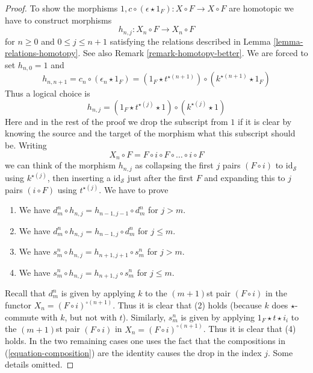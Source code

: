 \begin{proof}
\medskip\noindent
To show the morphisms
$1, c \circ (\epsilon \star 1_F) : X \circ F \to X \circ F$
are homotopic we have to construct morphisms
$$
h_{n, j} : X_n \circ F \longrightarrow X_n \circ F
$$
for $n \geq 0$ and $0 \leq j \leq n + 1$
satisfying the relations described in Lemma \ref{lemma-relations-homotopy}.
See also Remark \ref{remark-homotopy-better}.
We are forced to set $h_{n, 0} = 1$ and
$$
h_{n , n + 1} = c_n \circ (\epsilon_n \star 1_F) =
(1_F \star t^{\star (n + 1)}) \circ (k^{\star (n + 1)} \star 1_F)
$$
Thus a logical choice is
$$
h_{n , j} =
(1_F \star t^{\star (j)} \star 1) \circ (k^{\star (j)} \star 1)
$$
Here and in the rest of the proof we drop the subscript from $1$
if it is clear by knowing the source and the target of the morphism
what this subscript should be. Writing
$$
X_n \circ F = F \circ i \circ F \circ \ldots \circ i \circ F
$$
we can think of the morphism $h_{n, j}$ as collapsing the first
$j$ pairs $(F \circ i)$ to $\text{id}_\mathcal{S}$ using $k^{\star (j)}$,
then inserting a $\text{id}_\mathcal{S}$ just after the first $F$ and
expanding this to $j$ pairs $(i \circ F)$ using $t^{\star (j)}$.
We have to prove
\begin{enumerate}
\item We have $d^n_m \circ h_{n, j} = h_{n - 1, j - 1} \circ d^n_m$
for $j > m$.
\item We have $d^n_m \circ h_{n, j} = h_{n - 1, j} \circ d^n_m$
for $j \leq m$.
\item We have $s^n_m \circ h_{n, j} = h_{n + 1, j + 1} \circ s^n_m$
for $j > m$.
\item We have $s^n_m \circ h_{n, j} = h_{n + 1, j} \circ s^n_m$
for $j \leq m$.
\end{enumerate}
Recall that $d^n_m$ is given by applying $k$ to the $(m + 1)$st pair
$(F \circ i)$ in the functor $X_n = (F \circ i)^{\circ (n + 1)}$. Thus
it is clear that (2) holds (because $k$ does $\star$-commute with $k$, but
not with $t$). Similarly, $s^n_m$ is given by applying
$1_F \star t \star i_i$ to the $(m + 1)$st pair $(F \circ i)$ in
$X_n = (F \circ i)^{\circ (n + 1)}$. Thus it is clear that (4) holds.
In the two remaining cases one uses the fact that the compositions
in (\ref{equation-composition}) are the identity causes the drop
in the index $j$. Some details omitted.
\end{proof}

